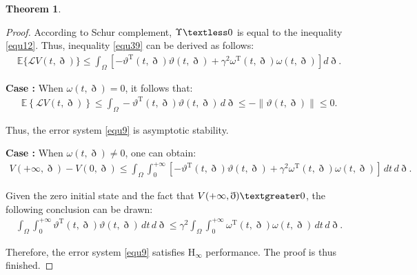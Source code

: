 \documentclass[preprint,review,fleqn,sort&compress,3p]{elsarticle}
\theoremstyle{definition}%
\newtheorem{thm}{Theorem}[section]
\begin{document}
\begin{thm}
\begin{proof}
		According to Schur complement, $\Upsilon  \textless 0$ is equal to the inequality \eqref{equ12}. Thus, inequality \eqref{equ39} can be derived as follows:
		\begin{align}
			\mathbb{E}\{ \mathcal{L} V(t, \eth) \} \leq  \int_{\Omega}  \left[- \vartheta^\text{T}(t, \eth) \vartheta(t, \eth) + \gamma^2 \omega^\text{T}(t, \eth) \omega(t, \eth)\right] d\eth.
		\end{align}
		
		\textbf{Case \uppercase\expandafter{} :} When $\omega(t,\eth) = 0$, it follows that:
		\begin{align}
			\mathbb{E} \left\{ \mathcal{L} V(t, \eth) \right\} \leq \int_{\Omega} -\vartheta^\text{T}(t, \eth) \vartheta(t, \eth) \, d\eth \leq -\| \vartheta(t, \eth) \| \leq 0.
		\end{align}
		
		Thus, the error system \eqref{equ9} is asymptotic stability.
		
		\textbf{Case \uppercase\expandafter{} :} When $\omega(t,\eth) \neq 0$, one can obtain:
		\begin{align}
			V(+\infty, \eth) - V(0, \eth) \leq \int_{\Omega} \int_{0}^{+\infty} \left[-\vartheta^\text{T}(t, \eth) \vartheta(t, \eth) + \gamma^2 \omega^\text{T}(t, \eth) \omega(t, \eth)\right] \, dt \, d\eth.
		\end{align}
		
		Given the zero initial state and the fact that $V(+\infty, \eth) \textgreater 0$, the following conclusion can be drawn:
		\begin{align}
			\int_{\Omega} \int_{0}^{+\infty} \vartheta^\text{T}(t, \eth) \vartheta(t, \eth) \, dt \, d\eth \leq \gamma^2 \int_{\Omega} \int_{0}^{+\infty} \omega^\text{T}(t, \eth) \omega(t, \eth) \, dt \, d\eth.
		\end{align}
		
		Therefore, the error system \eqref{equ9} satisfies $\text{H}_\infty$ performance. The proof is thus finished.
	\end{proof}
	

\end{thm}
\end{document}
